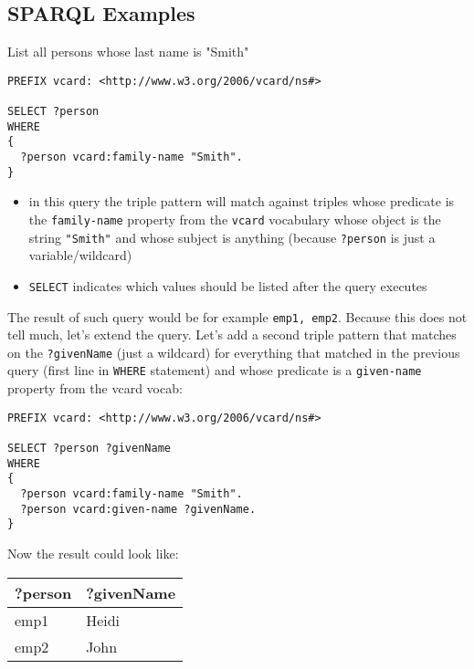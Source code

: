 \documentclass[11pt]{article}
\begin{document}
\subsection{SPARQL Examples}
\label{sec:org6d012fc}
List all persons whose last name is "Smith"
\lstset{breaklines=true,language=SQL,label= ,caption= ,captionpos=b,numbers=none}
\begin{lstlisting}
PREFIX vcard: <http://www.w3.org/2006/vcard/ns#>

SELECT ?person
WHERE
{
  ?person vcard:family-name "Smith".
}
\end{lstlisting}
\begin{itemize}
\item in this query the triple pattern will match against triples whose predicate is the \texttt{family-name} property from the \texttt{vcard} vocabulary whose object is the string \texttt{"Smith"} and whose subject is anything (because \texttt{?person} is just a variable/wildcard)
\item \texttt{SELECT} indicates which values should be listed after the query executes
\end{itemize}

The result of such query would be for example \texttt{emp1, emp2}. Because this does not tell much, let's extend the query. Let's add a second triple pattern that matches on the \texttt{?givenName} (just a wildcard) for everything that matched in the previous query (first line in \texttt{WHERE} statement) and whose predicate is a \texttt{given-name} property from the vcard vocab:
\lstset{breaklines=true,language=SQL,label= ,caption= ,captionpos=b,numbers=none}
\begin{lstlisting}
PREFIX vcard: <http://www.w3.org/2006/vcard/ns#>

SELECT ?person ?givenName
WHERE
{
  ?person vcard:family-name "Smith".
  ?person vcard:given-name ?givenName.
}
\end{lstlisting}
Now the result could look like:
\begin{center}
\begin{tabular}{ll}
?person & ?givenName\\
\hline
emp1 & Heidi\\
emp2 & John\\
\end{tabular}
\end{center}
\end{document}
